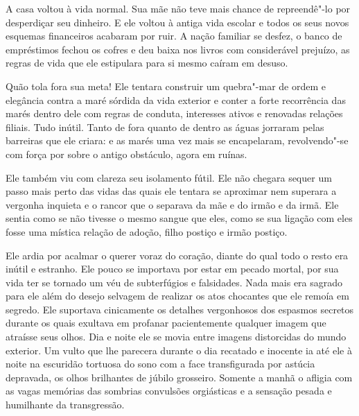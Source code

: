 A casa voltou à vida normal. Sua mãe não teve mais chance de
repreendê"-lo por desperdiçar seu dinheiro. E ele voltou à antiga vida
escolar e todos os seus novos esquemas financeiros acabaram por ruir. A
nação familiar se desfez, o banco de empréstimos fechou os cofres e deu
baixa nos livros com considerável prejuízo, as regras de vida que ele
estipulara para si mesmo caíram em desuso.

Quão tola fora sua meta! Ele tentara construir um quebra"-mar de ordem e
elegância contra a maré sórdida da vida exterior e conter a forte
recorrência das marés dentro dele com regras de conduta, interesses
ativos e renovadas relações filiais. Tudo inútil. Tanto de fora quanto
de dentro as águas jorraram pelas barreiras que ele criara: e as
marés uma vez mais se encapelaram, revolvendo"-se com força por sobre o
antigo obstáculo, agora em ruínas.

Ele também viu com clareza seu isolamento fútil. Ele não chegara sequer
um passo mais perto das vidas das quais ele tentara se aproximar nem
superara a vergonha inquieta e o rancor que o separava da mãe e do
irmão e da irmã. Ele sentia como se não tivesse o mesmo sangue que
eles, como se sua ligação com eles fosse uma mística relação de adoção,
filho postiço e irmão postiço.

Ele ardia por acalmar o querer voraz do coração, diante do qual todo o
resto era inútil e estranho. Ele pouco se importava por estar em pecado
mortal, por sua vida ter se tornado um véu de subterfúgios e
falsidades. Nada mais era sagrado para ele além do desejo selvagem de
realizar os atos chocantes que ele remoía em segredo. Ele suportava
cinicamente os detalhes vergonhosos dos espasmos secretos durante os
quais exultava em profanar pacientemente qualquer imagem que
atraísse seus olhos. Dia e noite ele se movia entre imagens distorcidas
do mundo exterior. Um vulto que lhe parecera durante o dia recatado e
inocente ia até ele à noite na escuridão tortuosa do sono com a face
transfigurada por astúcia depravada, os olhos brilhantes de júbilo
grosseiro. Somente a manhã o afligia com as vagas memórias das sombrias
convulsões orgiásticas e a sensação pesada e humilhante da
transgressão.


